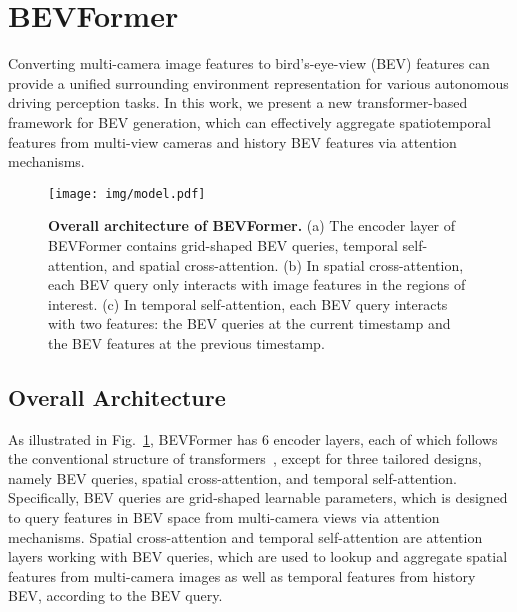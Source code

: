 \documentclass{article}
\begin{document}
\section{BEVFormer}
Converting multi-camera image features to bird's-eye-view (BEV) features can provide a unified surrounding environment representation for various autonomous driving perception tasks.
In this work, we present  a new transformer-based framework for BEV generation, which can effectively aggregate spatiotemporal features from multi-view cameras and history BEV features via attention mechanisms.


\begin{figure}[t]
\centering
\texttt{[image: img/model.pdf]}
\caption{\textbf{Overall architecture of BEVFormer.} (a) The encoder layer of BEVFormer contains grid-shaped BEV queries, temporal self-attention, and spatial cross-attention. (b) In spatial cross-attention, each BEV query only interacts with image features in the regions of interest. (c) In temporal self-attention, each BEV query interacts with two features: the BEV queries at the current timestamp and the BEV features at the previous  timestamp.}
\label{fig:model}
\end{figure}

\subsection{Overall Architecture}
As illustrated in Fig.~\ref{fig:model}, BEVFormer has 6 encoder layers, each of which follows the conventional structure of transformers~\cite{vaswani2017attention}, except for three tailored designs, namely BEV queries, spatial cross-attention, and temporal self-attention.
Specifically, BEV queries are grid-shaped learnable parameters, which is designed to query features in BEV space from multi-camera views via attention mechanisms. Spatial cross-attention and temporal self-attention are attention layers working with BEV queries, which are used
to lookup and aggregate spatial features from multi-camera images as well as temporal features from history BEV, according to the BEV query.
\end{document}
